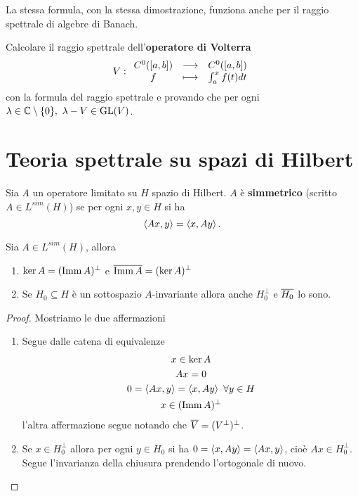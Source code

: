 \begin{remark}
La stessa formula, con la stessa dimostrazione, funziona anche per il raggio spettrale di algebre di Banach.
\end{remark}

\begin{exercise}
Calcolare il raggio spettrale dell'\textbf{operatore di Volterra}
\[V:\begin{array}{ccc} {C^0([a,b])} & \longrightarrow & {C^0([a,b])}\\ {f} & \longmapsto & {\int_a^x f(t)dt} \end{array}\]
con la formula del raggio spettrale e provando che per ogni $\lambda\in \mathbb{C}\setminus\{0\},\ \lambda-V\in \mathrm{GL}(V)$.
\end{exercise}



\section{Teoria spettrale su spazi di Hilbert}

\begin{definition}
Sia $A$ un operatore limitato su $H$ spazio di Hilbert. $A$ \`e \textbf{simmetrico} (scritto $A\in L^{sim}(H)$) se per ogni $x,y\in H$ si ha
\[\left\langle {Ax,y}\right\rangle=\left\langle {x,Ay}\right\rangle.\]
\end{definition}

\begin{proposition}[]\label{PrOperatoriSimmetriciSuHilbertOrtogonaliNucleiImmaginiChiusure}
Sia $A\in L^{sim}(H)$, allora
\begin{enumerate}
    \item $\ker A=(\operatorname{Imm} A)^\perp$ e $\overline{\operatorname{Imm} A}=(\ker A)^{\perp}$
    \item Se $H_0\subseteq H$ \`e un sottospazio $A$-invariante allora anche $H_0^\perp$ e $\overline{H_0}$ lo sono.
\end{enumerate}
\end{proposition}
\begin{proof}
Mostriamo le due affermazioni
\begin{enumerate}
    \item Segue dalle catena di equivalenze
    \begin{gather*}
        x\in \ker A\\
        Ax=0\\
        0=\left\langle {Ax,y}\right\rangle=\left\langle {x,Ay}\right\rangle\ \forall y\in H\\
        x\in (\operatorname{Imm} A)^\perp
    \end{gather*}
    l'altra affermazione segue notando che $\overline{V}=(V^\perp)^\perp$.
    \item Se $x\in H_0^\perp$ allora per ogni $y\in H_0$ si ha $0=\left\langle {x,Ay}\right\rangle=\left\langle {Ax,y}\right\rangle$, cio\`e $Ax\in H_0^\perp$. Segue l'invarianza della chiusura prendendo l'ortogonale di nuovo.
\end{enumerate}
\end{proof}

